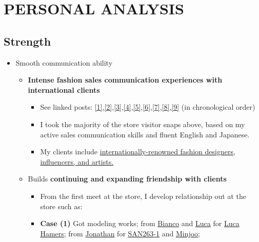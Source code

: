 \documentclass[a4paper,10pt]{extarticle}
\begin{document}
\section*{PERSONAL ANALYSIS}
\subsection*{Strength}
\begin{itemize}
	\item Smooth communication ability
	      \begin{itemize}
		      \item \textbf{Intense fashion sales communication experiences with international clients}
		            \begin{itemize}
			            \item See linked posts: \href{https://www.instagram.com/p/C47FInpLIux/?utm_source=ig_web_copy_link&igsh=MzRlODBiNWFlZA==}{[1]},\href{https://www.instagram.com/p/C5aQcCALU54/?utm_source=ig_web_copy_link&igsh=MzRlODBiNWFlZA==}{[2]},\href{https://www.instagram.com/p/C58A9wprDEQ/?utm_source=ig_web_copy_link&igsh=MzRlODBiNWFlZA==}{[3]},\href{https://www.instagram.com/p/C7BDa1HLDih/?utm_source=ig_web_copy_link&igsh=MzRlODBiNWFlZA==}{[4]},\href{https://www.instagram.com/p/C8VwTsfKz-k/?utm_source=ig_web_copy_link&igsh=MzRlODBiNWFlZA==}{[5]},\href{https://www.instagram.com/p/C9hJyLhpWOw/?utm_source=ig_web_copy_link&igsh=MzRlODBiNWFlZA==}{[6]},\href{https://www.instagram.com/p/C_ZoCo2pVOI/?utm_source=ig_web_copy_link&igsh=MzRlODBiNWFlZA==}{[7]},\href{https://www.instagram.com/p/DAQP1_tJIwg/?utm_source=ig_web_copy_link&igsh=MzRlODBiNWFlZA==}{[8]},\href{https://www.instagram.com/p/DBXvsyGzFNj/?utm_source=ig_web_copy_link&igsh=MzRlODBiNWFlZA==}{[9]} (in chronological order)
			            \item I took the majority of the store visitor snaps above, based on my active sales communication skills and fluent English and Japanese.
			            \item My clients include \ul{internationally-renowned fashion designers, influencers, and artists.}
		            \end{itemize}
		      \item Builds \textbf{continuing and expanding friendship with clients}
		            \begin{itemize}
			            \item From the first meet at the store, I develop relationship out at the store such as:
			            \item \textbf{Case (1)} Got modeling works; from \href{https://www.instagram.com/mrbianco}{Bianco} and \href{https://www.instagram.com/lucahamers}{Luca} for \href{URL}{Luca Hamers}; from \href{https://www.instagram.com/jccchurro}{Jonathan} for \href{https://www.instagram.com/san263_1}{SAN263-1} and \href{https://www.instagram.com/zooo_g}{Minjoo};

\end{itemize}
\end{itemize}
\end{itemize}
\end{document}

